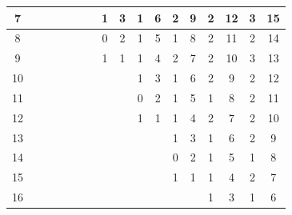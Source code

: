 \documentclass{article}
\numberwithin{equation}{section}
\begin{document}
\begin{table}[htb!]
{\begin{tabular}{|c|cc|cc|cc|cc|cc|cc|cc|cc|}
7 & \multicolumn{1}{c|}{} &  & \multicolumn{1}{c|}{} &  & \multicolumn{1}{c|}{} &  & \multicolumn{1}{c|}{1} & 3 & \multicolumn{1}{c|}{1} & 6 & \multicolumn{1}{c|}{2} & 9 & \multicolumn{1}{c|}{2} & 12 & \multicolumn{1}{c|}{3} & 15 \\ \hline
8 & \multicolumn{1}{c|}{} &  & \multicolumn{1}{c|}{} &  & \multicolumn{1}{c|}{} &  & \multicolumn{1}{c|}{0} & 2 & \multicolumn{1}{c|}{1} & 5 & \multicolumn{1}{c|}{1} & 8 & \multicolumn{1}{c|}{2} & 11 & \multicolumn{1}{c|}{2} & 14 \\ \hline
9 & \multicolumn{1}{c|}{} &  & \multicolumn{1}{c|}{} &  & \multicolumn{1}{c|}{} &  & \multicolumn{1}{c|}{1} & 1 & \multicolumn{1}{c|}{1} & 4 & \multicolumn{1}{c|}{2} & 7 & \multicolumn{1}{c|}{2} & 10 & \multicolumn{1}{c|}{3} & 13 \\ \hline
10 & \multicolumn{1}{c|}{} &  & \multicolumn{1}{c|}{} &  & \multicolumn{1}{c|}{} &  & \multicolumn{1}{c|}{} &  & \multicolumn{1}{c|}{1} & 3 & \multicolumn{1}{c|}{1} & 6 & \multicolumn{1}{c|}{2} & 9 & \multicolumn{1}{c|}{2} & 12 \\ \hline
11 & \multicolumn{1}{c|}{} &  & \multicolumn{1}{c|}{} &  & \multicolumn{1}{c|}{} &  & \multicolumn{1}{c|}{} &  & \multicolumn{1}{c|}{0} & 2 & \multicolumn{1}{c|}{1} & 5 & \multicolumn{1}{c|}{1} & 8 & \multicolumn{1}{c|}{2} & 11 \\ \hline
12 & \multicolumn{1}{c|}{} &  & \multicolumn{1}{c|}{} &  & \multicolumn{1}{c|}{} &  & \multicolumn{1}{c|}{} &  & \multicolumn{1}{c|}{1} & 1 & \multicolumn{1}{c|}{1} & 4 & \multicolumn{1}{c|}{2} & 7 & \multicolumn{1}{c|}{2} & 10 \\ \hline
13 & \multicolumn{1}{c|}{} &  & \multicolumn{1}{c|}{} &  & \multicolumn{1}{c|}{} &  & \multicolumn{1}{c|}{} &  & \multicolumn{1}{c|}{} &  & \multicolumn{1}{c|}{1} & 3 & \multicolumn{1}{c|}{1} & 6 & \multicolumn{1}{c|}{2} & 9 \\ \hline
14 & \multicolumn{1}{c|}{} &  & \multicolumn{1}{c|}{} &  & \multicolumn{1}{c|}{} &  & \multicolumn{1}{c|}{} &  & \multicolumn{1}{c|}{} &  & \multicolumn{1}{c|}{0} & 2 & \multicolumn{1}{c|}{1} & 5 & \multicolumn{1}{c|}{1} & 8 \\ \hline
15 & \multicolumn{1}{c|}{} &  & \multicolumn{1}{c|}{} &  & \multicolumn{1}{c|}{} &  & \multicolumn{1}{c|}{} &  & \multicolumn{1}{c|}{} &  & \multicolumn{1}{c|}{1} & 1 & \multicolumn{1}{c|}{1} & 4 & \multicolumn{1}{c|}{2} & 7 \\ \hline
16 & \multicolumn{1}{c|}{} &  & \multicolumn{1}{c|}{} &  & \multicolumn{1}{c|}{} &  & \multicolumn{1}{c|}{} &  & \multicolumn{1}{c|}{} &  & \multicolumn{1}{c|}{} &  & \multicolumn{1}{c|}{1} & 3 & \multicolumn{1}{c|}{1} & 6 \\ \hline

\end{tabular}}
\end{table}
\end{document}
